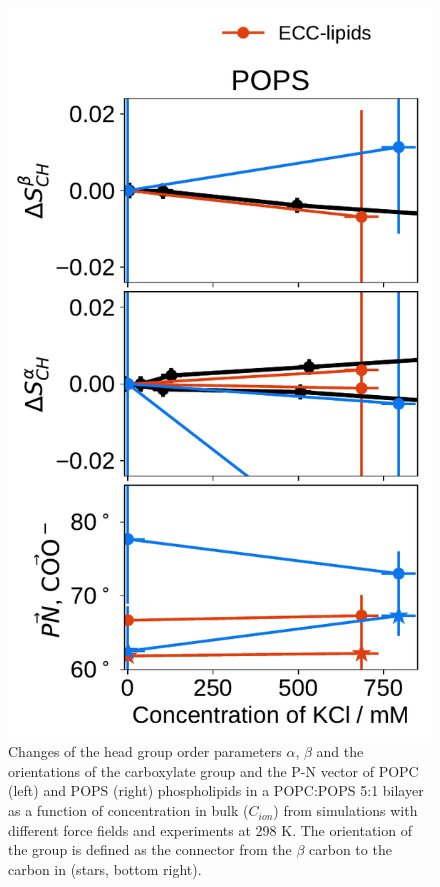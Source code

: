 \begin{figure}[tbp!]
  \includegraphics[width=\figwidthsmall]{../img/ecc_pops/order_parameters_changes_ecc-lip_L14_A-B-PN-COO_POPS_kcl.pdf} 
  \caption{\label{fig:delta_ordPar_KCl_PCPS} 
    Changes of the head group order parameters $\alpha$, $\beta$ and the orientations of the carboxylate group and the P-N vector  
    of POPC (left) and POPS (right) phospholipids in a POPC:POPS 5:1 bilayer as a function of  concentration 
    in bulk ($C_{ion}$) from simulations with different force fields and experiments at 298 K. \citep{roux90}
    The orientation of the  group is defined as 
    the connector from the $\beta$ carbon to the carbon in  (stars, bottom right). 
  } 
\end{figure} 
 




